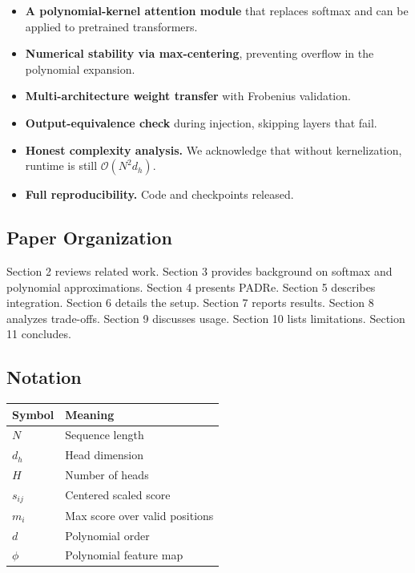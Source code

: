 \begin{itemize}
\item \textbf{A polynomial-kernel attention module} that replaces softmax and can be
  applied to pretrained transformers.
\item \textbf{Numerical stability via max-centering}, preventing overflow in the
  polynomial expansion.
\item \textbf{Multi-architecture weight transfer} with Frobenius validation.
\item \textbf{Output-equivalence check} during injection, skipping layers that fail.
\item \textbf{Honest complexity analysis.} We acknowledge that without kernelization,
  runtime is still $\mathcal{O}(N^2 d_h)$.
\item \textbf{Full reproducibility.} Code and checkpoints released.

\end{itemize}
\subsection{Paper Organization}

Section 2 reviews related work. Section 3 provides background on softmax 
and polynomial approximations. Section 4 presents PADRe. Section 5 describes 
integration. Section 6 details the setup. Section 7 reports results. Section 
8 analyzes trade-offs. Section 9 discusses usage. Section 10 lists 
limitations. Section 11 concludes.



\subsection{Notation}

\begin{table}[H]
\centering
\small
\begin{tabular}{ll}
\toprule
\textbf{Symbol} & \textbf{Meaning} \\
\midrule
$N$ & Sequence length \\
$d_h$ & Head dimension \\
$H$ & Number of heads \\
$s_{ij}$ & Centered scaled score \\
$m_i$ & Max score over valid positions \\
$d$ & Polynomial order \\
$\phi$ & Polynomial feature map \\
\bottomrule
\end{tabular}
\end{table}



